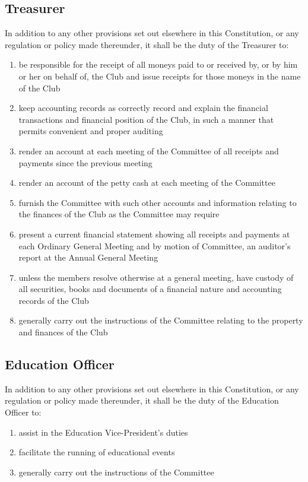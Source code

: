 \documentclass[11pt]{article} %
\begin{document}
\subsection{Treasurer}
In addition to any other provisions set out elsewhere in this Constitution, or any regulation or policy made thereunder, it shall be the duty of the Treasurer to:
\begin{enumerate}
	\item be responsible for the receipt of all moneys paid to or received by, or by him or her on behalf of, the Club and issue receipts for those moneys in the name of the Club
	\item keep accounting records as correctly record and explain the financial transactions and financial position of the Club, in such a manner that permits convenient and proper auditing
	\item render an account at each meeting of the Committee of all receipts and payments since the previous meeting
	\item render an account of the petty cash at each meeting of the Committee
	\item furnish the Committee with such other accounts and information relating to the finances of the Club as the Committee may require
	\item present a current financial statement showing all receipts and payments at each Ordinary General Meeting and by motion of Committee, an auditor's report at the Annual General Meeting
	\item unless the members resolve otherwise at a general meeting, have custody of all securities, books and documents of a financial nature and accounting records of the Club
	\item generally carry out the instructions of the Committee relating to the property and finances of the Club
\end{enumerate}

\subsection{Education Officer}
In addition to any other provisions set out elsewhere in this Constitution, or any regulation or policy made thereunder, it shall be the duty of the Education Officer to:
\begin{enumerate}
	\item assist in the Education Vice-President's duties
	\item facilitate the running of educational events
	\item generally carry out the instructions of the Committee
\end{enumerate}
\end{document}
